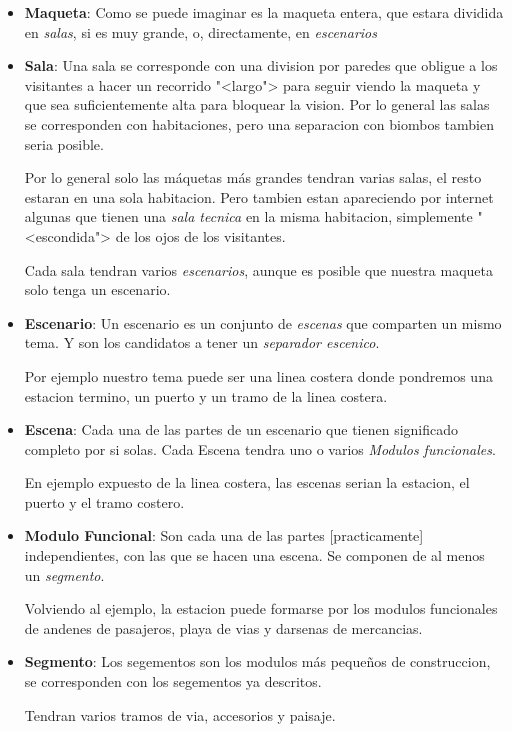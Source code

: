 \begin{itemize}
\item \textbf{Maqueta}: Como se puede imaginar es la maqueta entera, que estara dividida en \textit{salas}, si es muy grande, o, directamente, en \textit{escenarios} 
\item \textbf{Sala}: Una sala se corresponde con una division por paredes que obligue a los visitantes a hacer un recorrido "<largo"> para seguir viendo la maqueta y que sea suficientemente alta para bloquear la vision. Por lo general las salas se corresponden con habitaciones, pero una separacion con biombos tambien seria posible.

Por lo general solo las máquetas más grandes tendran varias salas, el resto estaran en una sola habitacion. Pero tambien estan apareciendo por internet algunas que tienen una \textit{sala tecnica} en la misma habitacion, simplemente "<escondida"> de los ojos de los visitantes.

Cada sala tendran varios \textit{escenarios}, aunque es posible que nuestra maqueta solo tenga un escenario.
\item \textbf{Escenario}: Un escenario es un conjunto de \textit{escenas} que comparten un mismo tema. Y son los candidatos a tener un \textit{separador escenico}.

Por ejemplo nuestro tema puede ser una linea costera donde pondremos una estacion termino, un puerto y un tramo de la linea costera.
\item \textbf{Escena}: Cada una de las partes de un escenario que tienen significado completo por si solas. Cada Escena tendra uno o varios \textit{Modulos funcionales}.

En ejemplo expuesto de la linea costera, las escenas serian la estacion, el puerto y el tramo costero. 

\item \textbf{Modulo Funcional}: Son cada una de las partes [practicamente] independientes, con las que se hacen una escena. Se componen de al menos un \textit{segmento}.

Volviendo al ejemplo, la estacion puede formarse por los modulos funcionales de andenes de pasajeros, playa de vias y darsenas de mercancias.

\item \textbf{Segmento}: Los segementos son los modulos más pequeños de construccion, se corresponden con los segementos ya descritos. 

Tendran varios tramos de via, accesorios\sidenote{} y paisaje.
\end{itemize}

